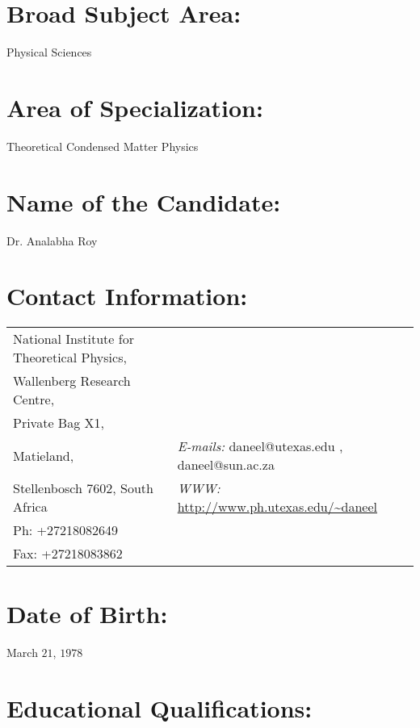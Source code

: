 \documentclass[a4paper,11pt,color]{article}
\begin{document}
\pagebreak
\section{\sc Broad Subject Area:}
Physical Sciences

\section{\sc Area of Specialization:} 
Theoretical Condensed Matter Physics

\section{\sc Name of the Candidate:} 
Dr. Analabha Roy

\section{\sc Contact Information:		}
\vspace{.05in}
\begin{tabular}{@{}p{2.5in}p{4in}}

National Institute for Theoretical Physics, \\
Wallenberg Research Centre,\\
Private Bag X1, \\
Matieland,& {\it E-mails:}  daneel@utexas.edu , daneel@sun.ac.za\\
Stellenbosch $7602$, South Africa & {\it WWW:} \url{http://www.ph.utexas.edu/\~daneel}  \\
Ph: +27218082649 \\
Fax: +27218083862 \\
\end{tabular}
\section{\sc Date of Birth:			}
March $21$, $1978$
 
\section{\sc Educational Qualifications:}
\end{document}
